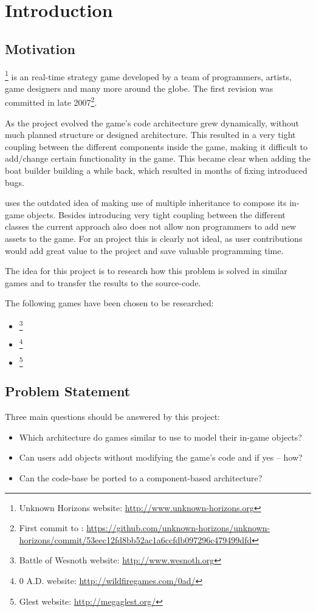 

\section{Introduction}

\subsection{Motivation}
\UH{}\footnote{Unknown Horizons website: \url{http://www.unknown-horizons.org}} is an \OS{} real-time strategy game developed by a team of programmers, artists, game
designers and many more around the globe. The first revision was committed in late 2007\footnote{First commit to \UH{}:
\url{https://github.com/unknown-horizons/unknown-horizons/commit/53eec12fd8bb52ac1a6ccfdb097296c479499dfd}}.

As the project evolved the game's code architecture grew dynamically, without much planned structure or
designed architecture. This resulted in a very tight coupling between the different components inside the game, making
it difficult to add/change certain functionality in the game. This became clear when adding the boat builder building
a while back, which resulted in months of fixing introduced bugs.

\UH{} uses the outdated idea of making use of multiple inheritance to compose its in-game objects. Besides introducing
very tight coupling between the different classes the current approach also does not allow non programmers to add new
assets to the game. For an \OS{} project this is clearly not ideal, as user contributions would add great value to the
project and save valuable programming time.

The idea for this project is to research how this problem is solved in similar \OS{} games and to transfer the results to
the \UH{} source-code. 

The following games have been chosen to be researched:
\begin{itemize}
    \item \BOW{}\footnote{Battle of Wesnoth website: \url{http://www.wesnoth.org}}
    \item \AD{}\footnote{0 A.D. website: \url{http://wildfiregames.com/0ad/}}
    \item \GLEST{}\footnote{Glest website: \url{http://megaglest.org/}}
\end{itemize}

\subsection{Problem Statement}
Three main questions should be answered by this project:
\begin{itemize}
    \item Which architecture do \OS{} games similar to \UH{} use to model their in-game objects?
    \item Can users add objects without modifying the game's code and if yes -- how?
    \item Can the \UH{} code-base be ported to a component-based architecture?
\end{itemize}

